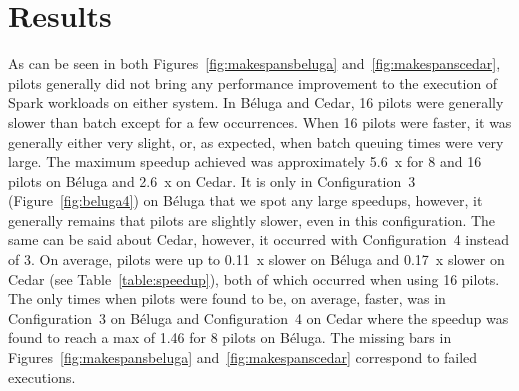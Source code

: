 \documentclass{IEEEtran}
\newcommand{\todo}[1]{\marginpar{\parbox{18mm}{\flushleft\tiny\color{red}\textbf{TODO}:
      #1}}}
\begin{document}


\section{Results}\label{sec:results}

As can be seen in both Figures~\ref{fig:makespansbeluga} and~\ref{fig:makespanscedar}, pilots 
generally did not bring any performance improvement to the execution of Spark workloads
on either system. In B\'eluga and Cedar, 16 pilots were generally slower than batch except for a 
few occurrences. When 16 pilots were faster, it was generally either very slight, or, as expected,
when batch queuing times were very large. The maximum speedup achieved
was approximately 5.6~x for 8 and 16 pilots on B\'eluga and 2.6~x on Cedar. 
It is only in Configuration~3 (Figure~\ref{fig:beluga4}) on B\'eluga
that we spot any large speedups, however, it generally remains that
pilots are slightly slower, even in this configuration. The same can be said about Cedar, however,
it occurred with Configuration~4 instead of 3. On average, pilots were up to 0.11~x slower on B\'eluga and
0.17~x slower on Cedar (see Table~\ref{table:speedup}), both of which occurred when using 16 pilots.
The only times when pilots were found to be, on average, faster, was in Configuration~3 on B\'eluga
and Configuration~4 on Cedar where the speedup was found to reach a max of 1.46 for 8 pilots on 
B\'eluga. The missing bars in Figures~\ref{fig:makespansbeluga} and~\ref{fig:makespanscedar} correspond to 
failed executions.
\end{document}

